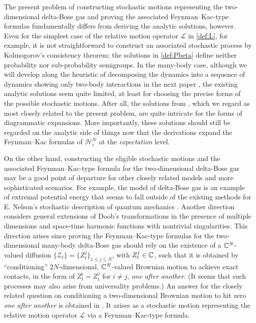 \documentclass[12pt, twoside]{article}
\numberwithin{figure}{section}
\newcommand{\1}{\mathds 1}
\newcommand{\vep}{{\varepsilon}}
\newcommand{\ms}{\mathscr}
\newcommand{\2}{{\mathbf 1}}
\newcommand{\CN}{{\mathbb C}^{\it N}}
\begin{document}
 
The present problem of constructing stochastic motions representing the two-dimensional delta-Bose gas and proving the associated Feynman--Kac-type formulas fundamentally differs from deriving the analytic solutions, however. Even for the simplest case of the relative motion operator $\ms L$ in \eqref{def:L}, for example, it is not straightforward to construct an associated stochastic process by Kolmogorov's consistency theorem; the solutions in \eqref{def:Pbeta} define neither probability nor sub-probability semigroups. In the many-body case, although we will develop along the heuristic of decomposing the dynamics into a sequence of dynamics showing only two-body interactions in the next paper \cite{C:SDBG2}, the existing analytic solutions seem quite limited, at least for choosing the precise forms of the possible stochastic motions. After all, the solutions from \cite{GQT,C:DBG}, which we regard as most closely related to the present problem,
are quite intricate for the forms of diagrammatic expansions. More importantly, these solutions should still be regarded on the analytic side of things now that the derivations expand the Feynman--Kac formulas of $\ms H_\vep^N$ at the \emph{expectation} level. 

On the other hand, constructing the eligible stochastic motions and the associated Feynman--Kac-type formula for the two-dimensional delta-Bose gas may be a good point of departure for other closely related models and more sophisticated scenarios. For example, the model of delta-Bose gas is an example of extremal potential energy that seems to fall outside of the existing methods for E. Nelson's stochastic description of quantum mechanics \cite{Nelson}. Another direction considers general extensions of Doob's transformations in the presence of multiple dimensions and space-time harmonic functions with nontrivial singularities. This direction arises since proving the Feynman--Kac-type formulas for the two-dimensional many-body delta-Bose gas should rely on the existence of a $\CN$-valued diffusion $\{\ms Z_t\}=\{Z^j_t\}_{1\leq j\leq N}$, with $Z_t^j\in \Bbb C$, such that it is obtained by ``conditioning'' $2N$-dimensional, $\CN$-valued Brownian motion to achieve exact contacts, in the form of $Z^i_t=Z^j_t$ for $i\neq j$, \emph{one after another}. (It seems that such processes may also arise from universality problems.) An answer for the closely related question on conditioning a two-dimensional Brownian motion to hit zero \emph{one after another} is obtained in \cite{C:BES}. It arises as a stochastic motion representing the relative motion operator $\ms L$ via a Feynman--Kac-type formula. 
\end{document}
